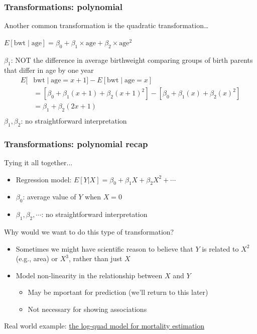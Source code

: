 \documentclass[10pt,t]{beamer}
\begin{document}
\begin{frame}
\frametitle{Transformations: polynomial}
Another common transformation is the quadratic transformation\dots
\begin{center} $E[\text{bwt} \mid \text{age}] = \beta_0 + \beta_1 \times \text{age} + \beta_2 \times \text{age}^2$ \end{center}

$\beta_1$: \color{red} NOT \color{black} the difference in average birthweight comparing groups of birth parents that differ in age by one year \pause
\begin{align*}
E[& \text{bwt} \mid \text{age} = x + 1] -E[\text{bwt} \mid \text{age} = x]\\
& = \left[\beta_0 + \beta_1 (x+1) + \beta_2(x+1)^2\right] -\left[\beta_0 + \beta_1 (x) + \beta_2(x)^2\right]\\
& = \beta_1 + \beta_2(2x+1) \\
\end{align*}\pause
\color{blue} $\beta_1,\beta_2$: no straightforward interpretation \color{black}
\end{frame}

\begin{frame}
\frametitle{Transformations: polynomial recap}
Tying it all together...
\begin{itemize}
	\item \color{blue} Regression model: \color{black} $E[Y|X] = \beta_0 + \beta_1X + \beta_2 X^2 + \cdots$
	\item \color{blue} $\beta_0$: \color{black} average value of $Y$ when $X = 0$
	\item \color{blue} $\beta_1, \beta_2, \cdots$: \color{black} no straightforward interpretation
\end{itemize}\pause

\vspace{0.3cm}

Why would we want to do this type of transformation?
\begin{itemize}
	\item Sometimes we might have scientific reason to believe that $Y$ is related to $X^2$ (e.g., area) or $X^3$, rather than just $X$
	\item Model non-linearity in the relationship between $X$ and $Y$
	\begin{itemize}
		\item May be mportant for prediction (we'll return to this later)
		\item Not necessary for showing associations 
	\end{itemize}
\end{itemize}

\vspace{0.3cm}

Real world example:  \href{https://www.ncbi.nlm.nih.gov/pmc/articles/PMC4046865/}{\color{cyan} the log-quad model for mortality estimation}

\end{frame}
\end{document}
